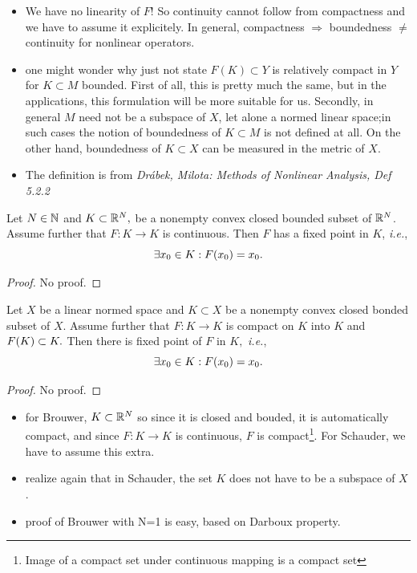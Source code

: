 \documentclass{article}
\begin{document}
\begin{remark}

	\begin{itemize}
		\item	We have no linearity of $F$! So continuity cannot follow from compactness and we have to assume it explicitely. In general, compactness $\Rightarrow $ boundedness $\neq$ continuity for nonlinear operators.
		\item one might wonder why just not state $F(K) \subset Y$ is relatively compact in $Y$ for $K \subset M $ bounded. First of all, this is pretty much the same, but in the applications, this formulation will be more suitable for us. Secondly, in general $M$ need not be a subspace of $X$, let alone a normed linear space;in such cases the notion of boundedness of $K \subset M$ is not defined at all. On the other hand, boundedness of $K \subset X$ can be measured in the metric of $X.$
		\item	The definition is from \textit{Drábek, Milota: Methods of Nonlinear Analysis, Def 5.2.2}
	\end{itemize}
\end{remark}

\begin{theorem}
	Let $N \in {\mathbb N}$ and $K \subset {\mathbb R}^N,$ be a nonempty convex closed bounded subset of ${\mathbb R}^{N}$. Assume further that $F: K \to K$ is continuous. Then $F$ has a fixed point in $K$, \textit{i.e.},
	\[
		\exists x_0 \in K: F\qty(x_{0}) = x_0.
	\]
\end{theorem}

\begin{proof}
	No proof.
\end{proof}

\begin{theorem}
	Let $X$ be a linear normed space and $K \subset X$ be a nonempty convex closed bonded subset of $X$. Assume further that $F: K \to K$ is compact on $K$ into $K$ and $F\qty(K) \subset K.$ Then there is fixed point of $F$ in $K,$ \textit{i.e.},
	\[
		\exists x_0 \in K: F\qty(x_0) = x_0.
	\]
\end{theorem}

\begin{proof}
	No proof.
\end{proof}

\begin{remark}
\begin{itemize}
	\item for Brouwer, $K \subset {\mathbb R}^N$ so since it is closed and bouded, it is automatically compact, and since $F: K \to K$ is continuous, $F$ is compact\footnote{Image of a compact set under continuous mapping is a compact set}. For Schauder, we have to assume this extra.
	\item realize again that in Schauder, the set $K$ does not have to be a subspace of $X$.
	\item proof of Brouwer with N=1 is easy, based on Darboux property.
\end{itemize}
\end{remark}
\end{document}
